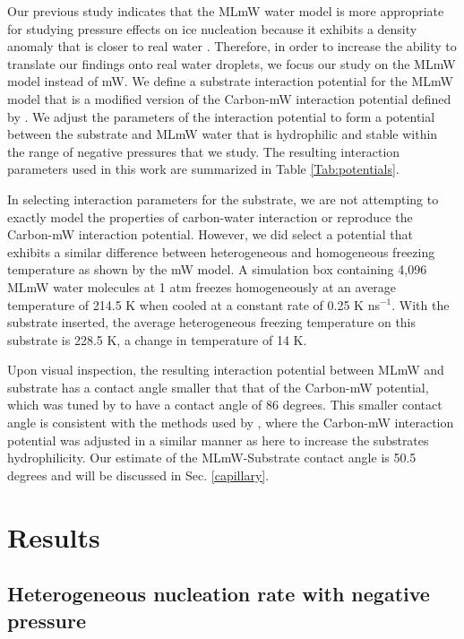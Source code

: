 \documentclass[journal abbreviation, manuscript]{copernicus}
\begin{document}
Our previous study \citep{rosky2022} indicates that the MLmW water model is more appropriate for studying pressure effects on ice nucleation because it exhibits a density anomaly that is closer to real water \citep{chan2019}. Therefore, in order to increase the ability to translate our findings onto real water droplets, we focus our study on the MLmW model instead of mW. We define a substrate interaction potential for the MLmW model that is a modified version of the Carbon-mW interaction potential defined by \citet{lupi2014}. We adjust the parameters of the interaction potential to form a potential between the substrate and MLmW water that is hydrophilic and stable within the range of negative pressures that we study. The resulting interaction parameters used in this work are summarized in Table \ref{Tab:potentials}.

In selecting interaction parameters for the substrate, we are not attempting to exactly model the properties of carbon-water interaction or reproduce the Carbon-mW interaction potential. However, we did select a potential that exhibits a similar difference between heterogeneous and homogeneous freezing temperature as shown by the mW model. A simulation box containing 4,096 MLmW water molecules at 1 atm freezes homogeneously at an average temperature of 214.5 K when cooled at a constant rate of 0.25 K ns$^{-1}$. With the substrate inserted, the average heterogeneous freezing temperature on this substrate is 228.5 K, a change in temperature of 14 K. 

Upon visual inspection, the resulting interaction potential between MLmW and substrate has a contact angle smaller that that of the Carbon-mW potential, which was tuned by \citet{lupi2014} to have a contact angle of 86 degrees. This smaller contact angle is consistent with the methods used by \citet{Bi2016}, where the Carbon-mW interaction potential was adjusted in a similar manner as here to increase the substrates hydrophilicity. Our estimate of the MLmW-Substrate contact angle is 50.5 degrees and will be discussed in Sec. \ref{capillary}.



\section{Results}
\subsection{Heterogeneous nucleation rate with negative pressure} \label{sec:hetrate}
\end{document}
